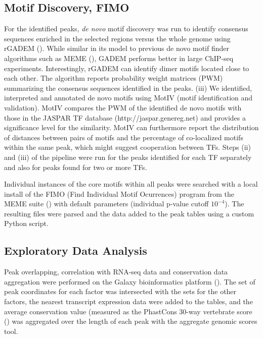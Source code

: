 \subsection{Motif Discovery, FIMO}

For the identified peaks, \textit{de novo} motif discovery was run to identify consensus sequences enriched in the selected regions versus the whole genome using rGADEM (\cite{Li2009a}). While similar in its model to previous de novo motif finder algorithms such as MEME (\cite{Bailey2006}), GADEM performs better in large ChIP-seq experiments. Interestingly, rGADEM can identify dimer motifs located close to each other. The algorithm reports probability weight matrices (PWM) summarizing the consensus sequences identified in the peaks. (iii) We identified, interpreted and annotated de novo motifs using MotIV (motif identification and validation). MotIV compares the PWM of the identified de novo motifs with those in the JASPAR TF database (http://jaspar.genereg.net) and provides a significance level for the similarity. MotIV can furthermore report the distribution of distances between pairs of motifs and the percentage of co-localized motifs within the same peak, which might suggest cooperation between TFs. Steps (ii) and (iii) of the pipeline were run for the peaks identified for each TF separately and also for peaks found for two or more TFs. 

Individual instances of the core motifs within all peaks were searched with a local install of the FIMO (Find Individual Motif Ocurrences) program from the MEME suite (\cite{Bailey2009}) with default parameters (individual p-value cutoff $10^{-4}$). The resulting files were parsed and the data added to the peak tables using a custom Python script. 



\subsection{Exploratory Data Analysis}


Peak overlapping, correlation with RNA-seq data and conservation data aggregation were performed on the Galaxy bioinformatics platform (\cite{Blankenberg2010a, Goecks2010}). The set of peak coordinates for each factor was intersected with the sets for the other factors, the nearest transcript expression data were added to the tables, and the average conservation value (measured as the PhastCons 30-way vertebrate score (\cite{Siepel2005}) was aggregated over the length of each peak with the aggregate genomic scores tool.

